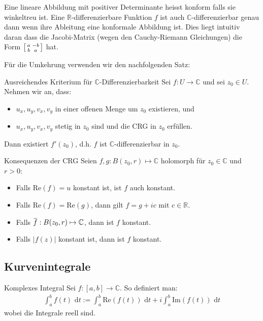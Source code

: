 \documentclass[a4paper,10pt]{article}
\def\R{\mathbb{R}}
\def\C{\mathbb{C}}
\def\dt{\text{ d}t}
\def\Re{\text{Re}}
\def\Im{\text{Im}}
\newcommand{\overbar}[1]{\mkern 1.5mu\overline{\mkern-1.5mu#1\mkern-1.5mu}\mkern 1.5mu}
\begin{document}
Eine lineare Abbildung mit positiver Determinante heisst konform falls sie winkeltreu ist. Eine $\R$-differenzierbare Funktion $f$ ist auch $\C$-differenzierbar genau dann wenn ihre Ableitung eine konformale Abbildung ist. Dies liegt intuitiv daran dass die Jacobi-Matrix (wegen den Cauchy-Riemann Gleichungen) die Form $\begin{bsmallmatrix}
  a & -b\\
  b & a
\end{bsmallmatrix}$ hat.

Für die Umkehrung verwenden wir den nachfolgenden Satz:

\begin{mainbox}{Ausreichendes Kriterium für $\C$-Differenzierbarkeit}
  Sei \(f \colon U \to \mathbb{C}\) und sei \(z_0 \in U\). Nehmen wir an, dass:
  \begin{itemize}
    \item \(u_x,u_y,v_x,v_y\) in einer offenen Menge um \(z_0\) existieren, und
    \item \(u_x,u_y,v_x,v_y\) stetig in \(z_0\) sind und die CRG in \(z_0\) erfüllen.
  \end{itemize}
  Dann existiert \(f'(z_0)\), d.h. \(f\) ist \(\mathbb{C}\)-differenzierbar in \(z_0\).
\end{mainbox}

\begin{subbox}{Konsequenzen der CRG}
  Seien $f, g: B(z_0, r) \mapsto \C$ holomorph für $z_0 \in \C$ und $r > 0$:
  \begin{itemize}
    \item Falls $\Re(f) = u$ konstant ist, ist $f$ auch konstant.
    \item Falls $\Re(f) = \Re(g)$, dann gilt $f = g + ic$ mit $c \in \R$.
    \item Falls $\overbar{f}: B(z_0, r) \mapsto \C$, dann ist $f$ konstant.
    \item Falls $|f(z)|$ konstant ist, dann ist $f$ konstant.
  \end{itemize}
\end{subbox}

\subsection{Kurvenintegrale}

\begin{mainbox}{Komplexes Integral}
  Sei \(f \colon [a,b] \to \mathbb{C}\). So definiert man:
  \begin{align*}
    \int_a^b f(t) \dt:=\int_a^b \Re(f(t)) \dt + i \int_a^b \Im(f(t)) \dt 
  \end{align*}
  wobei die Integrale reell sind.
\end{mainbox}
\end{document}
